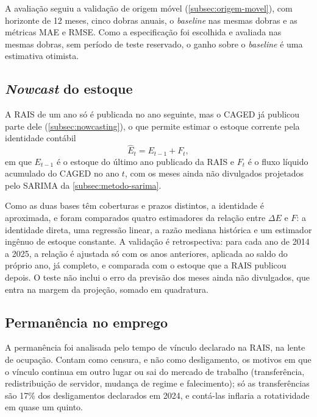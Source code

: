 A avaliação seguiu a validação de origem móvel (\autoref{subsec:origem-movel}), com horizonte de 12 meses, cinco dobras anuais, o \textit{baseline} nas mesmas dobras e as métricas MAE e RMSE. Como a especificação foi escolhida e avaliada nas mesmas dobras, sem período de teste reservado, o ganho sobre o \textit{baseline} é uma estimativa otimista.

\subsection{\textit{Nowcast} do estoque}
\label{subsec:metodo-nowcast}

A RAIS de um ano só é publicada no ano seguinte, mas o CAGED já publicou parte dele (\autoref{subsec:nowcasting}), o que permite estimar o estoque corrente pela identidade contábil
\begin{equation}
    \widehat{E}_t = E_{t-1} + F_t,
\end{equation}
em que $E_{t-1}$ é o estoque do último ano publicado da RAIS e $F_t$ é o fluxo líquido acumulado do CAGED no ano $t$, com os meses ainda não divulgados projetados pelo SARIMA da \autoref{subsec:metodo-sarima}.

Como as duas bases têm coberturas e prazos distintos, a identidade é aproximada, e foram comparados quatro estimadores da relação entre $\Delta E$ e $F$: a identidade direta, uma regressão linear, a razão mediana histórica e um estimador ingênuo de estoque constante. A validação é retrospectiva: para cada ano de 2014 a 2025, a relação é ajustada só com os anos anteriores, aplicada ao saldo do próprio ano, já completo, e comparada com o estoque que a RAIS publicou depois. O teste não inclui o erro da previsão dos meses ainda não divulgados, que entra na margem da projeção, somado em quadratura.

\subsection{Permanência no emprego}
\label{subsec:metodo-sobrevivencia}

A permanência foi analisada pelo tempo de vínculo declarado na RAIS, na lente de ocupação. Contam como censura, e não como desligamento, os motivos em que o vínculo continua em outro lugar ou sai do mercado de trabalho (transferência, redistribuição de servidor, mudança de regime e falecimento); só as transferências são 17\% dos desligamentos declarados em 2024, e contá-las inflaria a rotatividade em quase um quinto.

